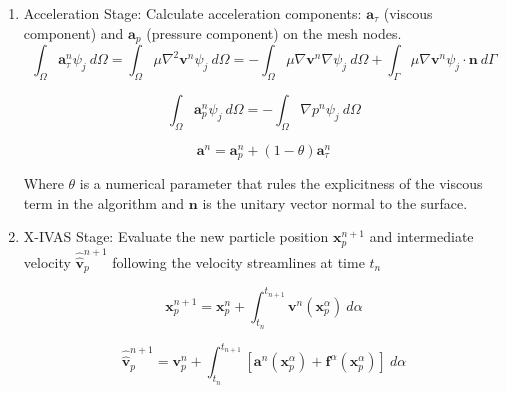 \begin{enumerate}
  \item Acceleration Stage: Calculate acceleration components: $\mathbf{a}_{\tau}$ (viscous component) and $\mathbf{a}_{p}$ (pressure component) on the mesh nodes.
  \begin{equation}\label{Step1a}
\int_{\Omega}\mathbf{a}^{n}_{\tau}\psi_j\ d\Omega=\int_{\Omega}\mu \nabla^{2}\mathbf{v}^{n} \psi_j\ d\Omega=-\int_{\Omega}\mu \nabla\mathbf{v}^{n} \nabla \psi_j\ d\Omega + \int_{\Gamma}\mu \nabla\mathbf{v}^{n} \psi_j \cdot \mathbf{n} \ d\Gamma
\end{equation}

\begin{equation}\label{Step1b}
\int_{\Omega}\mathbf{a}^{n}_{p}\psi_j\ d\Omega=-\int_{\Omega}\nabla p^{n} \psi_j\ d\Omega
\end{equation}

\begin{equation}\label{Step1c}
\mathbf{a}^{n}=\mathbf{a}^{n}_{p} + (1-\theta)\mathbf{a}^{n}_{\tau}
\end{equation}

Where $\theta$ is a numerical parameter that rules the explicitness of the viscous term in the algorithm and $\mathbf{n}$ is the unitary vector normal to the surface.

  \item X-IVAS Stage: Evaluate the new particle position $\mathbf{x}^{n+1}_{p}$ and intermediate velocity $\widehat{\widehat{\mathbf{v}}}^{n+1}_{p}$ following the velocity streamlines at time $t_n$

  \begin{equation}\label{Step2a}
\mathbf{x}^{n+1}_{p}=\mathbf{x}^{n}_{p} + \int_{t_n}^{t_{n+1}} \mathbf{v}^{n}(\mathbf{x}_p^{\alpha}) \ d\alpha
\end{equation}

\begin{equation}\label{Step2b}
\displaystyle \widehat{\widehat{\mathbf{v}}}^{n+1}_{p}=\mathbf{v}^{n}_{p} +
\int_{t_n}^{t_{n+1}} \left[ \mathbf{a}^{n}(\mathbf{x}_p^{\alpha}) + \mathbf{f}^{\alpha} (\mathbf{x}_p^{\alpha}) \right]
 \ d\alpha
\end{equation}


\end{enumerate}
